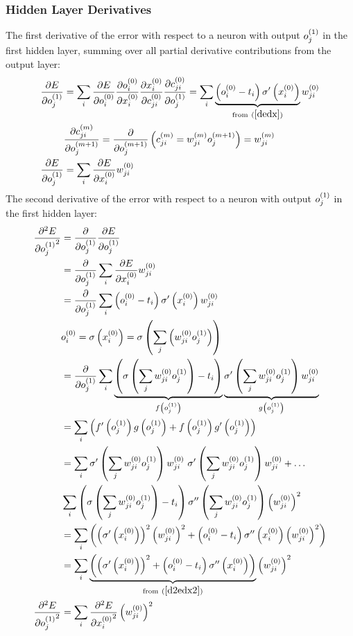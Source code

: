 \subsubsection{Hidden Layer Derivatives}
The first derivative of the error with respect to a neuron with output $o_{j}^{(1)}$ in the first hidden layer, summing over all partial derivative contributions from the output layer:
\begin{align}
\pdv{E}{o_{j}^{(1)}} &= 
\sum_i
\pdv{E}{o_{i}^{(0)}}
\pdv{o_{i}^{(0)}}{x_{i}^{(0)}}
\pdv{x_{i}^{(0)}}{c_{ji}^{(0)}}
\pdv{c_{ji}^{(0)}}{o_{j}^{(1)}}
= 
\sum_i
\underbrace{\left(o_{i}^{(0)} - t_{i}\right)\sigma^{\prime}\left(x_{i}^{(0)}\right)}
_{\text{from} \ (\ref{dedx})}
w_{ji}^{(0)}
\\
&\pdv{{c_{ji}^{(m)}}}{{o_{j}^{(m+1)}}} = \pdv{}{{o_{j}^{(m+1)}}}\left(c_{ji}^{(m)} = w_{ji}^{(m)}o_{j}^{(m+1)}\right) = w_{ji}^{(m)}\label{dcdo}
\\
\pdv{E}{o_{j}^{(1)}} &= \sum_i\pdv{E}{x_{i}^{(0)}}w_{ji}^{(0)}
\end{align}
The second derivative of the error with respect to a neuron with output $o_{j}^{(1)}$ in the first hidden layer:
\begin{align}
\pdv[2]{E}{{o_{j}^{(1)}}} &= 
\pdv{}{o_{j}^{(1)}}
\pdv{E}{o_{j}^{(1)}}
\\
&= \pdv{}{o_{j}^{(1)}}
\sum_i\pdv{E}{x_{i}^{(0)}}w_{ji}^{(0)}
\\
&= \pdv{}{o_{j}^{(1)}}
\sum_i
\left(o_{i}^{(0)} - t_{i}\right)\sigma^{\prime}\left(x_{i}^{(0)}\right)w_{ji}^{(0)}
\\
&{o_{i}^{(0)}} = \sigma\left({x_{i}^{(0)}}\right) = \sigma\left(\sum_j\left({w_{ji}^{(0)}}{o_{j}^{(1)}}\right)\right)
\\
&= \pdv{}{o_{j}^{(1)}}
\sum_i
\underbrace{\left(\sigma\left(\sum_j{w_{ji}^{(0)}}{o_{j}^{(1)}}\right) - t_{i}\right)}
_{f\left(o_{j}^{(1)}\right)}
\underbrace{\sigma^{\prime}\left(\sum_j{w_{ji}^{(0)}}{o_{j}^{(1)}}\right)w_{ji}^{(0)}}
_{g\left(o_{j}^{(1)}\right)}
\\
&=\sum_i\left(f^{\prime}\left(o_{j}^{(1)}\right)g\left(o_{j}^{(1)}\right) + f\left(o_{j}^{(1)}\right)g^{\prime}\left(o_{j}^{(1)}\right)\right)
\\
&=\sum_i
\sigma^{\prime}\left(\sum_j{w_{ji}^{(0)}}{o_{j}^{(1)}}\right)w_{ji}^{(0)} \
\sigma^{\prime}\left(\sum_j{w_{ji}^{(0)}}{o_{j}^{(1)}}\right)w_{ji}^{(0)}
+ \ldots \\
&\sum_i
\left(\sigma\left(\sum_j{w_{ji}^{(0)}}{o_{j}^{(1)}}\right) - t_{i}\right)
\sigma^{\prime\prime}\left(\sum_j{w_{ji}^{(0)}}{o_{j}^{(1)}}\right)\left(w_{ji}^{(0)}\right)^2
\\
&=
\sum_i\left(
\left(\sigma^{\prime}\left(x_{i}^{(0)}\right)\right)^2\left({w_{ji}^{(0)}}\right)^2
+ 
\left(o_{i}^{(0)} - t_{i}\right)
\sigma^{\prime\prime}\left(x_{i}^{(0)}\right)\left({w_{ji}^{(0)}}\right)^2
\right)
\\
&=\sum_i
\underbrace{\left(\left(\sigma^{\prime}\left(x_{i}^{(0)}\right)\right)^2
+ 
\left(o_{i}^{(0)} - t_{i}\right)
\sigma^{\prime\prime}\left(x_{i}^{(0)}\right)\right)}
_{\text{from} \ (\ref{d2edx2})}
\left({w_{ji}^{(0)}}\right)^2
\\
\pdv[2]{E}{{o_{j}^{(1)}}} &= \sum_i
\pdv[2]{E}{{x_{i}^{(0)}}} \left({w_{ji}^{(0)}}\right)^2
\end{align}
